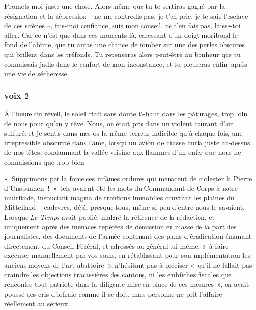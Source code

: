 \documentclass[
  extrafontsizes,
  oneside,
  14pt
]{memoir}
\begin{document}
Promets-moi juste une chose. Alors même que tu te sentiras gagné par la
résignation et la dépression -- ne me contredis pas, je t'en prie, je te sais
l'esclave de ces sirènes --, fais-moi confiance, suis mon conseil, ne t'en fais
pas, laisse-toi aller. Car ce n'est que dans ces moments-là, caressant d'un
doigt moribond le fond de l'abîme, que tu auras une chance de tomber sur une
des perles obscures qui brillent dans les tréfonds. Tu repenseras alors
peut-être au bonheur que tu connaissais jadis dans le confort de mon
inconstance, et tu pleureras enfin, après une vie de sécheresse.

\newpage

\subsubsection{voix 2}\label{voix-2}

À l'heure du réveil, le soleil riait sans doute là-haut dans les pâturages,
trop loin de nous pour qu'on y rêve. Nous, on était pris dans un violent
courant d'air sulfuré, et je sentis dans mes os la même terreur indicible qu'à
chaque fois, une irrépressible obscurité dans l'âme, lorsqu'un avion de chasse
hurla juste au-dessus de nos têtes, condamnant la vallée voisine aux flammes
d'un enfer que nous ne connaissions que trop bien.

«~Supprimons par la force ces infâmes ordures qui menacent de molester la
Pierre d'Unspunnen~!~», tels avaient été les mots du Commandant de Corps à
notre multitude, insouciant magma de troufions immobiles couvrant les plaines
du Mittelland -- cadavres, déjà, presque tous, même si peu d'entre nous le
savaient. Lorsque \emph{Le Temps} avait publié, malgré la réticence de la
rédaction, et uniquement après des menaces répétées de démission en masse de la
part des journalistes, des documents de l'armée contenant des plans
d'éradication émanant directement du Conseil Fédéral, et adressés au général
lui-même, «~à faire exécuter manuellement par vos soins, en rétablissant pour
son implémentation les anciens moyens de l'art abattoire~», n'hésitant pas à
préciser «~qu'il ne fallait pas craindre les objections tracassières des
cantons, ni les embûches fiscales que rencontre tout patriote dans la diligente
mise en place de ces mesures~», on avait poussé des cris d'orfraie comme il se
doit, mais personne ne prit l'affaire réellement au sérieux.
\end{document}
